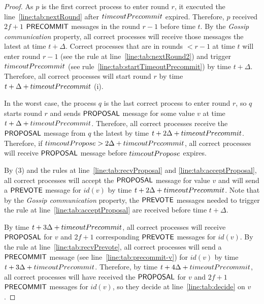 \begin{proof}
As $p$ is the first correct process to enter round $r$, it executed the line~\ref{line:tab:nextRound} after $timeoutPrecommit$ expired. Therefore, $p$ received $2f+1$ $\mathsf{PRECOMMIT}$ messages in the round $r-1$ before time $t$. By the \emph{Gossip communication} property, all correct processes will receive those messages the latest at time $t + \Delta$. Correct processes that
are in rounds $< r-1$ at time $t$ will enter round $r-1$ (see the rule at line~\ref{line:tab:nextRound2}) and trigger $timeoutPrecommit$ (see rule~\ref{line:tab:startTimeoutPrecommit})
by time $t+\Delta$. Therefore, all correct processes will start round $r$ by time $t+\Delta+timeoutPrecommit$ (i).
 
In the worst case, the process $q$ is the last correct process to enter round $r$, so $q$ starts round $r$ and sends $\mathsf{PROPOSAL}$ message for some value $v$ at time $t + \Delta + timeoutPrecommit$. Therefore, all correct processes receive the $\mathsf{PROPOSAL}$ message from $q$ the latest by time $t + 2\Delta + timeoutPrecommit$. Therefore, if $timeoutPropose > 2\Delta + timeoutPrecommit$, 
all correct processes will receive $\mathsf{PROPOSAL}$ message before $timeoutPropose$ expires. 

By (3) and the rules at line~\ref{line:tab:recvProposal} and \ref{line:tab:acceptProposal}, all correct processes will accept the $\mathsf{PROPOSAL}$ message for value $v$ and will send a $\mathsf{PREVOTE}$ message for $id(v)$ by time $t + 2\Delta + timeoutPrecommit$. 
Note that by the \emph{Gossip communication} property, the $\mathsf{PREVOTE}$ messages needed to trigger the rule at line~\ref{line:tab:acceptProposal} are received before time $t + \Delta$.  

By time $t + 3\Delta + timeoutPrecommit$, all correct processes will receive $\mathsf{PROPOSAL}$ for $v$ and $2f+1$ corresponding $\mathsf{PREVOTE}$ messages for $id(v)$. By the rule at line~\ref{line:tab:recvPrevote}, all correct processes will send a $\mathsf{PRECOMMIT}$ message (see line~\ref{line:tab:precommit-v}) for $id(v)$ by time $t + 3\Delta + timeoutPrecommit$. Therefore, by time $t + 4\Delta + timeoutPrecommit$, all correct processes will have received the $\mathsf{PROPOSAL}$ for $v$ and $2f+1$ $\mathsf{PRECOMMIT}$ messages for $id(v)$, so they decide at line~\ref{line:tab:decide} on $v$. 


\end{proof}
